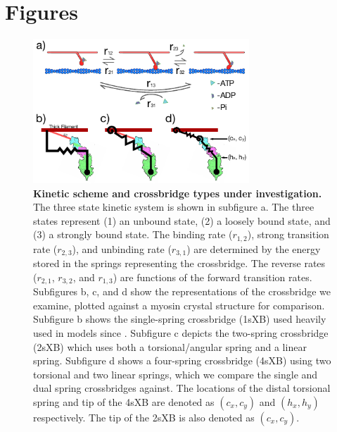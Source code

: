 \documentclass[]{article}
\begin{document}


\clearpage
\section*{Figures} %

\begin{figure}[htbp]
    \begin{center}
    \includegraphics[width=3.2in]{../imgs/Figure1.pdf}
    \caption{
        \label{fig_xb_types}
        \textbf{Kinetic scheme and crossbridge types under investigation.} 
        The three state kinetic system is shown in subfigure a. 
        The three states represent (1) an unbound state, (2) a loosely bound state, and (3) a strongly bound state. 
        The binding rate ($r_{1,2}$), strong transition rate ($r_{2,3}$), and unbinding rate ($r_{3,1}$) are determined by the energy stored in the springs representing the crossbridge. 
        The reverse rates ($r_{2,1}$, $r_{3,2}$, and $r_{1,3}$) are functions of the forward transition rates.
        Subfigures b, c, and d show the representations of the crossbridge we examine, plotted against a myosin crystal structure for comparison. 
        Subfigure b shows the single-spring crossbridge (1sXB) used heavily used in models since \protect\citep{Huxley:1957:p255}. 
        Subfigure c depicts the two-spring crossbridge (2sXB) which uses both a torsional/angular spring and a linear spring. 
        Subfigure d shows a four-spring crossbridge (4sXB) using two torsional and two linear springs, which we compare the single and dual spring crossbridges against.
        The locations of the distal torsional spring and tip of the 4sXB are denoted as $(c_x, c_y)$ and $(h_x, h_y)$ respectively. 
        The tip of the 2sXB is also denoted as $(c_x, c_y)$.
    }
    \end{center}
\end{figure}
\end{document}
